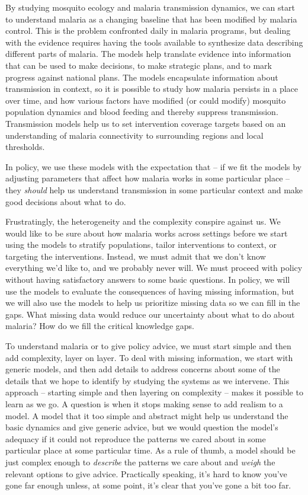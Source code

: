 \documentclass[
]{book}
\begin{document}
By studying mosquito ecology and malaria transmission dynamics, we can start to understand malaria as a changing baseline that has been modified by malaria control. This is the problem confronted daily in malaria programs, but dealing with the evidence requires having the tools available to synthesize data describing different parts of malaria. The models help translate evidence into information that can be used to make decisions, to make strategic plans, and to mark progress against national plans. The models encapsulate information about transmission in context, so it is possible to study how malaria persists in a place over time, and how various factors have modified (or could modify) mosquito population dynamics and blood feeding and thereby suppress transmission. Transmission models help us to set intervention coverage targets based on an understanding of malaria connectivity to surrounding regions and local thresholds.

In policy, we use these models with the expectation that -- if we fit the models by adjusting parameters that affect how malaria works in some particular place -- they \emph{should} help us understand transmission in some particular context and make good decisions about what to do.

Frustratingly, the heterogeneity and the complexity conspire against us. We would like to be sure about how malaria works across settings before we start using the models to stratify populations, tailor interventions to context, or targeting the interventions. Instead, we must admit that we don't know everything we'd like to, and we probably never will. We must proceed with policy without having satisfactory answers to some basic questions. In policy, we will use the models to evaluate the consequences of having missing information, but we will also use the models to help us prioritize missing data so we can fill in the gaps. What missing data would reduce our uncertainty about what to do about malaria? How do we fill the critical knowledge gaps.

To understand malaria or to give policy advice, we must start simple and then add complexity, layer on layer. To deal with missing information, we start with generic models, and then add details to address concerns about some of the details that we hope to identify by studying the systems as we intervene. This approach -- starting simple and then layering on complexity -- makes it possible to learn as we go. A question is when it stops making sense to add realism to a model. A model that it too simple and abstract might help us understand the basic dynamics and give generic advice, but we would question the model's adequacy if it could not reproduce the patterns we cared about in some particular place at some particular time. As a rule of thumb, a model should be just complex enough to \emph{describe} the patterns we care about and \emph{weigh} the relevant options to give advice. Practically speaking, it's hard to know you've gone far enough unless, at some point, it's clear that you've gone a bit too far.
\end{document}
